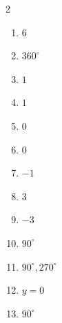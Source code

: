 \documentclass[11pt]{article}
\begin{document}
\begin{keybox}
\begin{multicols}{2}
\small
\begin{enumerate}[leftmargin=*,itemsep=3pt]
  \item $6$
  \item $360^\circ$
  \item $1$
  \item $1$
  \item $0$
  \item $0$
  \item $-1$
  \item $3$
  \item $-3$
  \item $90^\circ$
  \item $90^\circ,270^\circ$
  \item $y=0$
  \item $90^\circ$
\end{enumerate}
\end{multicols}
\end{keybox}
\end{document}

